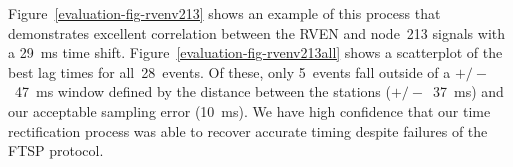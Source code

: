 Figure~\ref{evaluation-fig-rvenv213} shows an example of this process that
demonstrates excellent correlation between the RVEN and node~213 signals with
a 29~ms time shift. Figure~\ref{evaluation-fig-rvenv213all} shows a
scatterplot of the best lag times for all~28~events.  Of these, only 5~events
fall outside of a $+/-$~47~ms window defined by the distance between the
stations ($+/-$~37~ms) and our acceptable sampling error (10~ms). We have
high confidence that our time rectification process was able to recover
accurate timing despite failures of the FTSP protocol.

